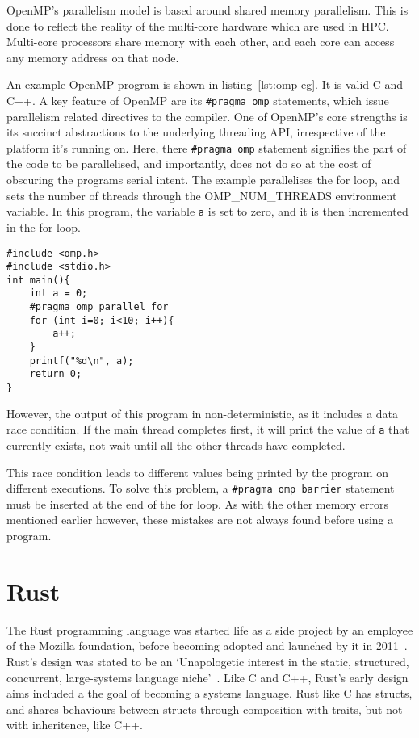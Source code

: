 OpenMP's parallelism model is based around shared memory parallelism. This is done to reflect the reality of the multi-core hardware which are used in HPC\@. Multi-core processors share memory with each other, and each core can access any memory address on that node.  

An example OpenMP program is shown in listing~\ref{lst:omp-eg}. It is valid C and C++. A key feature of OpenMP are its \texttt{\#pragma omp} statements, which issue parallelism related directives to the compiler. 
One of OpenMP's core strengths is its succinct abstractions to the underlying threading API, irrespective of the platform it's running on. Here, there \texttt{\#pragma omp} statement signifies the part of the code to be parallelised, and importantly, does not do so at the cost of obscuring the programs serial intent.
The example parallelises the for loop, and sets the number of threads through the OMP\_NUM\_THREADS environment variable. In this program, the variable \texttt{a} is set to zero, and it is then incremented in the for loop.

\begin{code}
\begin{verbatim}
#include <omp.h>
#include <stdio.h>
int main(){
    int a = 0;
    #pragma omp parallel for
    for (int i=0; i<10; i++){
        a++;
    }
    printf("%d\n", a);
    return 0;
}
\end{verbatim}
\label{lst:omp-eg}
\end{code}

However, the output of this program in non-deterministic, as it includes a data race condition. If the main thread completes first, it will print the value of \texttt{a} that currently exists, not wait until all the other threads have completed. 

This race condition leads to different values being printed by the program on different executions. To solve this problem, a \texttt{\#pragma omp barrier} statement must be inserted at the end of the for loop. As with the other memory errors mentioned earlier however, these mistakes are not always found before using a program.

\section{Rust}
The Rust programming language was started life as a side project by an employee of the Mozilla foundation, before becoming adopted and launched by it in 2011~\cite{FutureTense}. Rust's design was stated to be an `Unapologetic interest in the static, structured, concurrent, large-systems language niche'~\cite{pServo}. Like C and C++, Rust's early design aims included a the goal of becoming a systems language. Rust like C has structs, and shares behaviours between structs through composition with traits, but not with inheritence, like C++.

